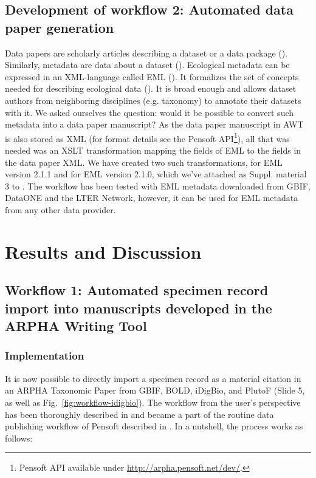 \subsection{Development of workflow 2: Automated data paper generation}

Data papers are scholarly articles describing a dataset or a data package (\cite{chavan_data_2011}). Similarly, metadata are data about a dataset (\cite{michener_meta-information_2006}). Ecological metadata can be expressed in an XML-language called EML (\cite{fegraus_maximizing_2005}). It formalizes the set of concepts needed for describing ecological data (\cite{fegraus_maximizing_2005}). It is broad enough and allows dataset authors from neighboring disciplines (e.g. taxonomy) to annotate their datasets with it. We asked ourselves the question: would it be possible to convert such metadata into a data paper manuscript? As the data paper manuscript in AWT is also stored as XML (for format details see the Pensoft API\footnote{Pensoft API available under \url{http://arpha.pensoft.net/dev/}.}), all that was needed was an XSLT transformation mapping the fields of EML to the fields in the data paper XML. We have created two such transformations, for EML version 2.1.1 and for EML version 2.1.0, which we've attached as Suppl. material 3 to \cite{senderov_online_2016}. The workflow has been tested with EML metadata downloaded from GBIF, DataONE and the LTER Network, however, it can be used for EML metadata from any other data provider.

\section{Results and Discussion}

\subsection{Workflow 1: Automated specimen record import into manuscripts developed in the ARPHA Writing Tool}

\subsubsection{Implementation}

It is now possible to directly import a specimen record as a material citation in an ARPHA Taxonomic Paper from GBIF, BOLD, iDigBio, and PlutoF (Slide 5, as well as Fig.~\ref{fig:workflow-idigbio}). The workflow from the user's perspective has been thoroughly described in \cite{senderov_online_2016} and became a part of the routine data publishing workflow of Pensoft described in \cite{penev_pensoft_2016}. In a nutshell, the process works as follows:

